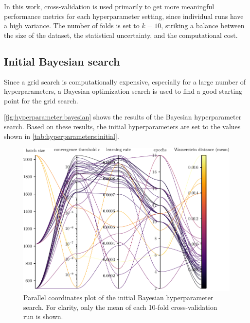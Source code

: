 In this work,
cross-validation is used primarily to get more meaningful performance metrics
for each hyperparameter setting,
  since individual runs have a high variance.
The number of folds is set to $k = 10$,
  striking a balance between
    the size of the dataset,
    the statistical uncertainty,
    and the computational cost.


\subsection{Initial Bayesian search} \label{sec:hyperparameters:initial_bayesian}
Since a grid search is computationally expensive,
  especially for a large number of hyperparameters,
a Bayesian optimization search \cite{wandb_bayesian} is used to find a good starting point for the grid search.

\autoref{fig:hyperparameter:bayesian} shows the results of the Bayesian hyperparameter search.
Based on these results,
the initial hyperparameters are set to the values shown in \autoref{tab:hyperparameters:initial}.


\begin{figure}
  \centering
  \includegraphics[scale=1]{content/plots/hyperparam/combined_pcplot_full.pdf}
  \caption{
    Parallel coordinates plot of the initial Bayesian hyperparameter search.
    For clarity, only the mean of each 10-fold cross-validation run is shown.
    }
  \label{fig:hyperparameter:bayesian}
\end{figure}

